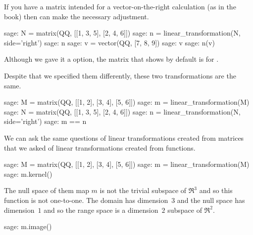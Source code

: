 If you have a matrix intended for a vector-on-the-right
calculation (as in the book) then \Sage{} can make the necessary adjustment.
\begin{sagecommandline}
sage: N = matrix(QQ, [[1, 3, 5], [2, 4, 6]])
sage: n = linear_transformation(N, side='right')
sage: n
sage: v = vector(QQ, [7, 8, 9])
sage: v
sage: n(v)  
\end{sagecommandline}
\noindent Although we gave it a  option, 
the matrix that \Sage{} shows by default is for 
.

Despite that we specified them differently, 
these two transformations are the same.
\begin{sagecommandline}
sage: M = matrix(QQ, [[1, 2], [3, 4], [5, 6]])
sage: m = linear_transformation(M)
sage: N = matrix(QQ, [[1, 3, 5], [2, 4, 6]])
sage: n = linear_transformation(N, side='right')
sage: m == n  
\end{sagecommandline}

We can ask the same questions of linear transformations created from
matrices that we asked of linear transformations created from functions.
\begin{sagecommandline}
sage: M = matrix(QQ, [[1, 2], [3, 4], [5, 6]])
sage: m = linear_transformation(M)
sage: m.kernel() 
\end{sagecommandline}

The null space of them map $m$ is not the trivial subspace of $\Re^3$ 
and so this function is not one-to-one.
The domain has dimension~$3$ and the null space has dimension~$1$ 
and so the
range space is a dimension~$2$ subspace of $\Re^2$.
\begin{sagecommandline} 
sage: m.image()
\end{sagecommandline}

